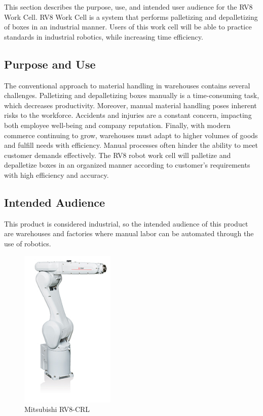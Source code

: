 This section describes the purpose, use, and intended user audience for the RV8 Work Cell. RV8 Work Cell is a system that performs palletizing and depalletizing of boxes in an industrial manner. Users of this work cell will be able to practice standards in industrial robotics, while increasing time efficiency. 
\subsection{Purpose and Use}
The conventional approach to material handling in warehouses contains several challenges. Palletizing and depalletizing boxes manually is a time-consuming task, which decreases productivity. Moreover, manual material handling poses inherent risks to the workforce. Accidents and injuries are a constant concern, impacting both employee well-being and company reputation. Finally, with modern commerce continuing to grow, warehouses must adapt to higher volumes of goods and fulfill needs with efficiency. Manual processes often hinder the ability to meet customer demands effectively. The RV8 robot work cell will palletize and depalletize boxes in an organized manner according to customer's requirements with high efficiency and accuracy.

\subsection{Intended Audience}
This product is considered industrial, so the intended audience of this product are warehouses and factories where manual labor can be automated through the use of robotics.

\begin{figure}[h!]
	\centering
   	\includegraphics[width=0.40\textwidth]{images/rv8crl.jpeg}
    \caption{Mitsubishi RV8-CRL  \cite{MitsubishiRV8CRL}}
\end{figure}
